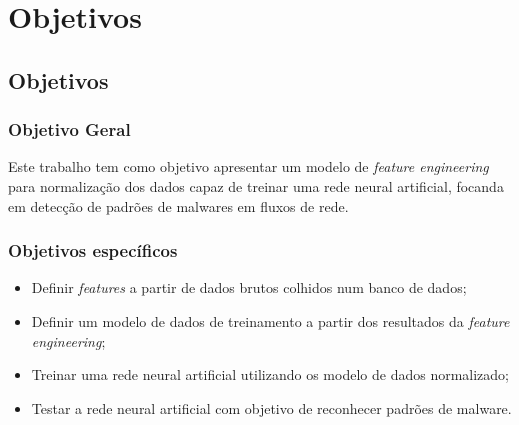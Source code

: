 \part{Objetivos}
\chapter[Objetivos]{Objetivos}

\section{Objetivo Geral}
    Este trabalho tem como objetivo apresentar um modelo de \textit{feature engineering} para normalização dos dados capaz de treinar uma rede neural artificial, focanda em detecção de padrões de malwares em fluxos de rede.


\section{Objetivos específicos}
    \begin{itemize}
        \item Definir \textit{features} a partir de dados brutos colhidos num banco de dados;
        \item Definir um modelo de dados de treinamento a partir dos resultados da \textit{feature engineering};
        \item Treinar uma rede neural artificial utilizando os modelo de dados normalizado;
        \item Testar a rede neural artificial com objetivo de reconhecer padrões de malware.
    \end{itemize}